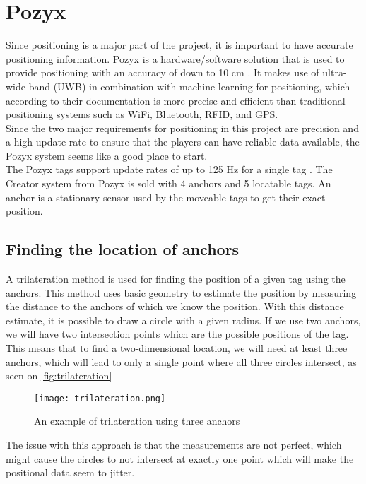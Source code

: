 \section{Pozyx}\label{sec:sprint1-pozyx}
Since positioning is a major part of the project, it is important to have accurate positioning information.
Pozyx is a hardware/software solution that is used to provide positioning with an accuracy of down to 10 cm \cite{pozyx}.
It makes use of ultra-wide band (UWB) in combination with machine learning for positioning, which according to their documentation is more precise and efficient than traditional positioning systems such as WiFi, Bluetooth, RFID, and GPS.
\\
Since the two major requirements for positioning in this project are precision and a high update rate to ensure that the players can have reliable data available, the Pozyx system seems like a good place to start.
\\
The Pozyx tags support update rates of up to 125 Hz for a single tag \cite{pozyx}.
The Creator system from Pozyx is sold with 4 anchors and 5 locatable tags.
An anchor is a stationary sensor used by the moveable tags to get their exact position.

\subsection{Finding the location of anchors}
A trilateration method is used for finding the position of a given tag using the anchors.
This method uses basic geometry to estimate the position by measuring the distance to the anchors of which we know the position.
With this distance estimate, it is possible to draw a circle with a given radius.
If we use two anchors, we will have two intersection points which are the possible positions of the tag.
This means that to find a two-dimensional location, we will need at least three anchors, which will lead to only a single point where all three circles intersect, as seen on \autoref{fig:trilateration}

\begin{figure}[H]
    \centering
    \texttt{[image: trilateration.png]}
    \caption{An example of trilateration using three anchors}
    \label{fig:trilateration}
\end{figure}

\noindent
The issue with this approach is that the measurements are not perfect, which might cause the circles to not intersect at exactly one point which will make the positional data seem to jitter.

